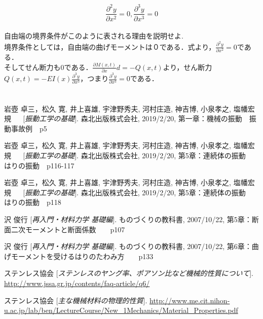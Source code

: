 \documentclass[xelatex,ja=standard,jafont=noto]{bxjsarticle}
\begin{document}
\begin{equation}
			\frac{\partial^{2}y}{\partial x^{2}}=0, \frac{\partial^{3}y}{\partial x^{3}}=0
\end{equation}\\


自由端の境界条件がこのように表される理由を説明せよ.\\


境界条件としては，自由端の曲げモーメントは０である．式より，$ \frac{\partial^{2}y}{\partial x^{2}}=0　$である．\\

そしてせん断力も0である．$ \frac{\partial M(x,t)}{\partial x}d=-Q(x,t)　$より，せん断力$ Q(x,t)=-EI(x)\frac{\partial^{3}y}{\partial x^{3}}　$，つまり$ \frac{\partial^{3}y}{\partial x^{3}}=0　$である．



\newpage


\section{}
\begin{thebibliography}{9}
岩壺 卓三，松久 寛, 井上喜雄, 宇津野秀夫, 河村庄造, 神吉博, 小泉孝之, 塩幡宏規 　
[\textit{振動工学の基礎}]. 
森北出版株式会社,  2019/2/20,  第一章：機械の振動　振動事故例　p5

岩壺 卓三，松久 寛, 井上喜雄, 宇津野秀夫, 河村庄造, 神吉博, 小泉孝之, 塩幡宏規 　
[\textit{振動工学の基礎}]. 
森北出版株式会社,  2019/2/20,  第5章：連続体の振動　はりの振動　p116-117

岩壺 卓三，松久 寛, 井上喜雄, 宇津野秀夫, 河村庄造, 神吉博, 小泉孝之, 塩幡宏規 　
[\textit{振動工学の基礎}]. 
森北出版株式会社,  2019/2/20,  第5章：連続体の振動　はりの振動　p118



沢 俊行 
[\textit{再入門・材料力学 基礎編}]. 
ものづくりの教科書,  2007/10/22,  第5章：断面二次モーメントと断面係数　　p107



沢 俊行 
[\textit{再入門・材料力学 基礎編}]. 
ものづくりの教科書,  2007/10/22,  第6章：曲げモーメントを受けるはりのたわみ方　　p133





ステンレス協会
[\textit{ステンレスのヤング率、ポアソン比など機械的性質について}]. 
\url{http://www.jssa.gr.jp/contents/faq-article/q6/}


ステンレス協会
[\textit{主な機械材料の物理的性質}]. 
\url{http://www.me.cit.nihon-u.ac.jp/lab/ben/LectureCourse/New_1Mechanics/Material_Properties.pdf}



\end{thebibliography}
\end{document}
